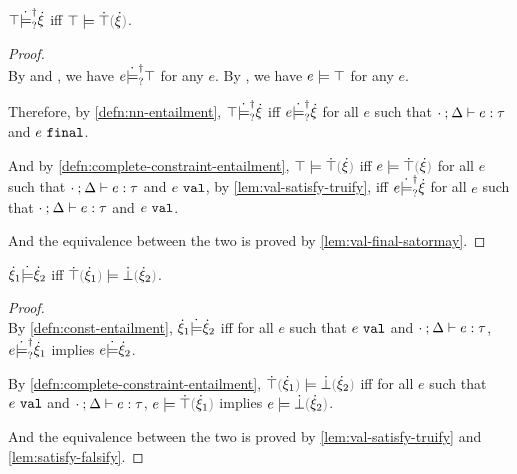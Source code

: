 \begin{theorem}
\label{thrm:demystify-exhaustiveness}
$\top \dot{\models}_{?}^{\dag} \dot{\xi}$ iff $\ccsatisfy{\ctruth}{\ctruify{\hxi}}$.
\end{theorem}
\begin{proof}\mbox{}\\

  By  and , we have $e \dot{\models}_{?}^{\dag} \top$ for any $e$.
  By , we have $e \models \top$ for any $e$.

  Therefore, by \autoref{defn:nn-entailment}, $\top \dot{\models}_{?}^{\dag} \dot{\xi}$ iff $e \dot{\models}_{?}^{\dag} \dot{\xi}$ for all $e$ such that $\cdot \mathbin{;} \Delta \vdash e : \tau$ and $e ~\mathtt{final}$.

  And by \autoref{defn:complete-constraint-entailment}, $\ccsatisfy{\ctruth}{\ctruify{\hxi}}$ 
  iff $\ccsatisfy{e}{\ctruify{\hxi}}$ for all $e$ such that $\cdot \mathbin{;} \Delta \vdash e : \tau$ and $e ~\mathtt{val}$, 
  by \autoref{lem:val-satisfy-truify}, iff $e \dot{\models}_{?}^{\dag} \dot{\xi}$ for all $e$ such that $\cdot \mathbin{;} \Delta \vdash e : \tau$ and $e ~\mathtt{val}$.
  
  And the equivalence between the two is proved by \autoref{lem:val-final-satormay}.
\end{proof}

\begin{theorem}
\label{thrm:demystify-redundancy}
$\dot{\xi}_1 \dot{\models} \dot{\xi}_2$ iff $\ccsatisfy{\ctruify{\hxi_1}}{\cfalsify{\hxi_2}}$.
\end{theorem}
\begin{proof}\mbox{}\\
  
  By \autoref{defn:const-entailment}, $\dot{\xi}_1 \dot{\models} \dot{\xi}_2$ iff for all $e$ such that $e ~\mathtt{val}$ and $\cdot \mathbin{;} \Delta \vdash e : \tau$, $e \dot{\models}_{?}^{\dag} \dot{\xi}_1$ implies $e \dot{\models} \dot{\xi}_2$.
  
  By \autoref{defn:complete-constraint-entailment}, $\ccsatisfy{\ctruify{\hxi_1}}{\cfalsify{\hxi_2}}$ iff for all $e$ such that $e ~\mathtt{val}$ and $\cdot \mathbin{;} \Delta \vdash e : \tau$, $\ccsatisfy{e}{\ctruify{\hxi_1}}$ implies $\ccsatisfy{e}{\cfalsify{\hxi_2}}$.
  
  And the equivalence between the two is proved by \autoref{lem:val-satisfy-truify} and \autoref{lem:satisfy-falsify}.
\end{proof}
